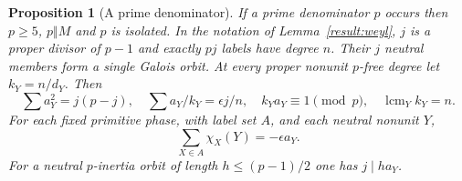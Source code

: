 \documentclass[11pt]{amsart}
\numberwithin{equation}{section}
\newtheorem{proposition}[theorem]{Proposition}
\theoremstyle{definition}
\theoremstyle{plain}
\DeclareMathOperator{\lcm}{lcm}
\begin{document}
\begin{proposition}[A prime denominator]\label{result.One-packet}
If a prime denominator $p$ occurs then $p\ge5$, $p\Vert M$ and
$p$ is isolated. In the notation of Lemma~\ref{result:weyl}, $j$ is
a proper divisor of $p-1$ and exactly $pj$ labels have degree $n$.
Their $j$ neutral members form a single Galois orbit. At every
proper nonunit $p$-free degree let $k_Y=n/d_Y$. Then
\[
 \sum a_Y^2=j(p-j),\quad \sum a_Y/k_Y=\epsilon j/n,\quad
 k_Ya_Y\equiv1\pmod p,\quad \lcm_Y k_Y=n .
\]
For
each fixed primitive phase, with label set $A$, and each neutral nonunit $Y$,
\begin{equation}\label{eq:packet-trace}
 \sum_{X\in A}\chi_X(Y)=-\epsilon a_Y.
\end{equation}
For a neutral $p$-inertia orbit of length $h\le(p-1)/2$ one has
$j\mid h a_Y$.
\end{proposition}
\end{document}
